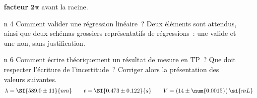 \documentclass[a4paper, 10pt, final, garamond]{book}
\begin{document}
\begin{enumerate}[label=\sqenumi]
\begin{isd}
{			\textbf{facteur}
			$\mathbf{2\pi}$  avant la racine.
		}%
	\end{isd}
	\vspace*{-20pt}
	\item[n]{4}%
	Comment valider une régression linéaire~? Deux éléments sont attendus, ainsi
	que deux schémas grossiers représentatifs de régressions~: une valide et une
	non, sans justification.
	\smallbreak
	\begin{isd}[righthand ratio=.6]
		\tcblower
		\noindent
		\begin{minipage}[t]{.48\linewidth}
			\begin{center}
			\end{center}
		\end{minipage}
		\hfill
		\begin{minipage}[t]{.48\linewidth}
			\vspace{0pt}
			\begin{center}
			\end{center}
		\end{minipage}
	\end{isd}
	\item[n]{6}%
	Comment écrire théoriquement un résultat de mesure en TP~? Que doit respecter
	l'écriture de l'incertitude~? Corriger alors la présentation des valeurs
	suivantes.
	\[
		\lambda = \SI{589.0\pm11}{nm}
		\qquad
		t = \SI{0.473 \pm 0.122}{s}
		\qquad
		V = (14 \pm \num{0.0015})\,\si{mL}
	\]
	\smallbreak
	\noindent
	\begin{isd}[lefthand ratio=.45]
\end{isd}
\end{enumerate}
\end{document}
